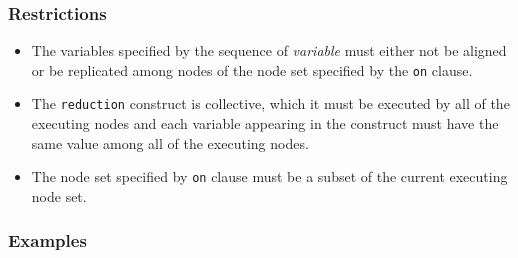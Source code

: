\subsubsection*{Restrictions}

\begin{itemize}
 \item The variables specified by the sequence of {\it variable} must
       either not be aligned or be replicated among nodes of the node
       set specified by the {\tt on} clause.
 \item The {\tt reduction} construct is collective, which it must be
       executed by all of the executing nodes and each variable
       appearing in the construct must have the same value among all of
       the executing nodes.
 \item The node set specified by {\tt on} clause must be a subset of the
       current executing node set.
\end{itemize}

\subsubsection*{Examples}

